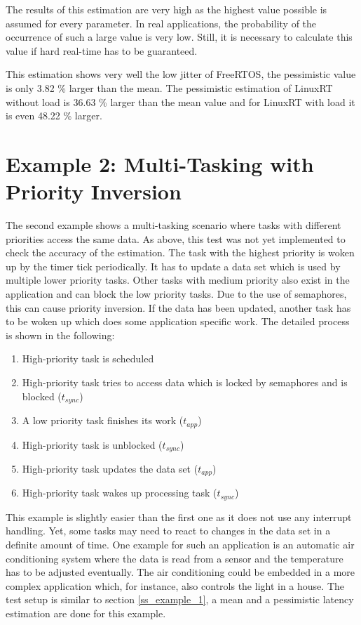 The results of this estimation are very high as the highest value possible is assumed for every parameter. 
In real applications, the probability of the occurrence of such a large value is very low.
Still, it is necessary to calculate this value if hard real-time has to be guaranteed.    
\par
This estimation shows very well the low jitter of FreeRTOS, the pessimistic value is only 3.82 \% larger than the mean.
The pessimistic estimation of LinuxRT without load is 36.63 \% larger than the mean value and for LinuxRT with load it is even 48.22 \% larger. 

\section{Example 2: Multi-Tasking with Priority Inversion}
The second example shows a multi-tasking scenario where tasks with different priorities access the same data.
As above, this test was not yet implemented to check the accuracy of the estimation.
The task with the highest priority is woken up by the timer tick periodically. 
It has to update a data set which is used by multiple lower priority tasks. 
Other tasks with medium priority also exist in the application and can block the low priority tasks.
Due to the use of semaphores, this can cause priority inversion.
If the data has been updated, another task has to be woken up which does some application specific work.
The detailed process is shown in the following:
\begin{enumerate}
	\item High-priority task is scheduled
	\item	High-priority task tries to access data which is locked by semaphores and is blocked ($t_{sync}$)
	\item A low priority task finishes its work ($t_{app}$)
	\item High-priority task is unblocked ($t_{sync}$)
	\item High-priority task updates the data set ($t_{app}$)
	\item High-priority task wakes up processing task ($t_{sync}$)
\end{enumerate}
This example is slightly easier than the first one as it does not use any interrupt handling. 
Yet, some tasks may need to react to changes in the data set in a definite amount of time.
One example for such an application is an automatic air conditioning system where the data is read from a sensor and the temperature has to be adjusted eventually. 
The air conditioning could be embedded in a more complex application which, for instance, also controls the light in a house.
The test setup is similar to section \ref{ss_example_1}, a mean and a pessimistic latency estimation are done for this example. 

